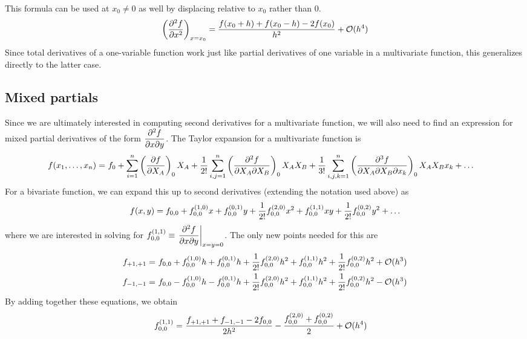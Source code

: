\documentclass[11pt]{article}
\begin{document}
This formula can be used at $x_0\neq 0$ as well by displacing relative to $x_0$
rather than $0$.
\begin{align*}
    \left(\dfrac{\partial^2f}{\partial x^2}\right)_{x=x_0} = 
    \dfrac{f(x_0+h)+f(x_0-h)-2f(x_0)}{h^2}+\mathcal{O}(h^4)
\end{align*}
Since total derivatives of a one-variable function work just like partial
derivatives of one variable in a multivariate function, this generalizes
directly to the latter case.

\subsection{Mixed partials}
Since we are ultimately interested in computing second derivatives for a
multivariate function, we will also need to find an expression for mixed
partial derivatives of the form $\dfrac{\partial^2f}{\partial x\partial y}$. The Taylor expansion
for a multivariate function is
\begin{align*}
    f(x_1,\ld,x_n) =&\ 
    f_0
    +\sum_{i=1}^n
    \pr{\fr{\pt f}{\pt X_A}}_0X_A
    +\fr{1}{2!}\sum_{i,j=1}^n
    \pr{\fr{\pt^2f}{\pt X_A\pt X_B}}_0X_AX_B
    +\fr{1}{3!}\sum_{i,j,k=1}^n
    \pr{\fr{\pt^3f}{\pt X_A\pt X_B\pt x_k}}_0
    X_AX_Bx_k
    +\ld
\end{align*}
For a bivariate function, we can expand this up to second derivatives
(extending the notation used above) as
\begin{align*}
    f(x,y) =
    f_{0,0} + f_{0,0}^{(1,0)}x + f_{0,0}^{(0,1)}y
    +\dfrac{1}{2!} f_{0,0}^{(2,0)}x^2
    +f_{0,0}^{(1,1)}xy
    +\dfrac{1}{2!} f_{0,0}^{(0,2)}y^2
    +\ldots
\end{align*}
where we are interested in solving for
$f_{0,0}^{(1,1)}\equiv\left.\dfrac{\partial^2f}{\partial x\partial y}\right|_{x=y=0}$.
The only new points needed for this are 
\begin{align*}
    f_{+1,+1} =&\ 
    f_{0,0} + f\ord{1,0}_{0,0}h+f\ord{0,1}_{0,0}h + 
    \fr{1}{2!}f\ord{2,0}_{0,0}h^2+f\ord{1,1}_{0,0} h^2
    +\fr{1}{2!} f\ord{0,2}_{0,0}h^2
    +\bigo(h^3)
    \\
    f_{-1,-1} =&\ 
    f_{0,0} - f\ord{1,0}_{0,0}h-f\ord{0,1}_{0,0}h + 
    \fr{1}{2!}f\ord{2,0}_{0,0}h^2+f\ord{1,1}_{0,0} h^2
    +\fr{1}{2!} f\ord{0,2}_{0,0}h^2
    -\bigo(h^3)
\end{align*}
By adding together these equations, we obtain
\begin{align*}
    f\ord{1,1}_{0,0} =&\ 
    \fr{f_{+1,+1}+f_{-1,-1}-2f_{0,0} }{2h^2}
    -\fr{f\ord{2,0}_{0,0} + f\ord{0,2}_{0,0}}{2}
    +\bigo(h^4)
\end{align*}
\end{document}
